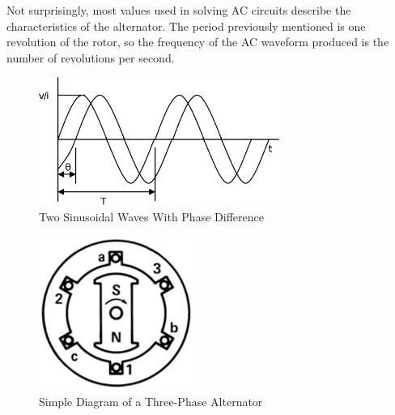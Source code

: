 \documentclass[11pt]{article}
\begin{document}
  Not surprisingly, most values used in solving \ac{AC} circuits describe the
  characteristics of the alternator.  The period previously mentioned is one
  revolution of the rotor, so the frequency of the \ac{AC} waveform produced is
  the number of revolutions per second.


  \begin{figure}[p]
    \centering
    \includegraphics[width=0.7\textwidth]{acwave}
    \caption{Two Sinusoidal Waves With Phase Difference}
    \label{acwave}
  \end{figure}

  \begin{figure}[p]
    \centering
    \includegraphics[width=0.45\textwidth]{threephasemotor}
    \caption{Simple Diagram of a Three-Phase Alternator}
    \label{alternator}
  \end{figure}

\end{document}
